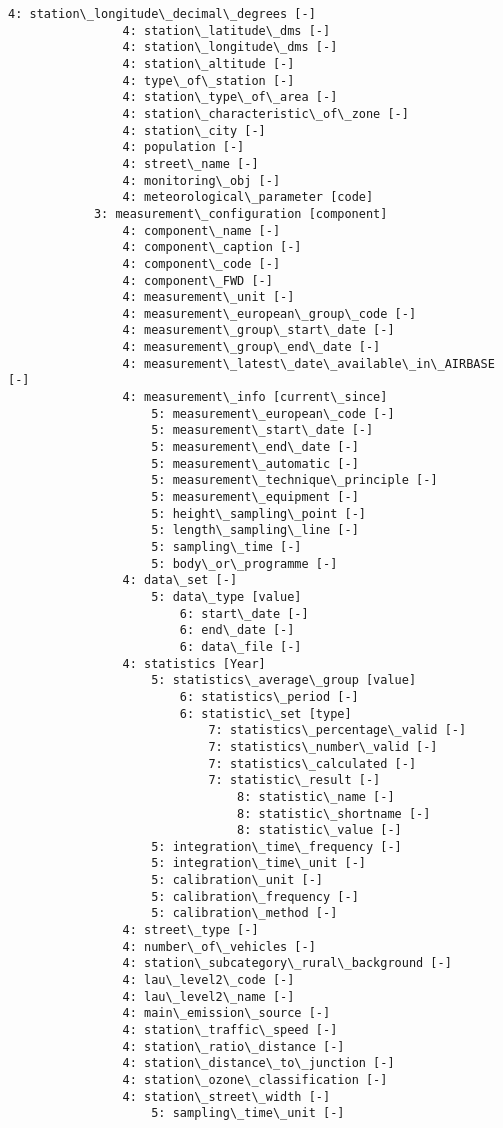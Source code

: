 \documentclass[11pt]{article}
\begin{document}
\begin{Verbatim}[commandchars=\\\{\}]
                4: station\_longitude\_decimal\_degrees [-]
                4: station\_latitude\_dms [-]
                4: station\_longitude\_dms [-]
                4: station\_altitude [-]
                4: type\_of\_station [-]
                4: station\_type\_of\_area [-]
                4: station\_characteristic\_of\_zone [-]
                4: station\_city [-]
                4: population [-]
                4: street\_name [-]
                4: monitoring\_obj [-]
                4: meteorological\_parameter [code]
            3: measurement\_configuration [component]
                4: component\_name [-]
                4: component\_caption [-]
                4: component\_code [-]
                4: component\_FWD [-]
                4: measurement\_unit [-]
                4: measurement\_european\_group\_code [-]
                4: measurement\_group\_start\_date [-]
                4: measurement\_group\_end\_date [-]
                4: measurement\_latest\_date\_available\_in\_AIRBASE [-]
                4: measurement\_info [current\_since]
                    5: measurement\_european\_code [-]
                    5: measurement\_start\_date [-]
                    5: measurement\_end\_date [-]
                    5: measurement\_automatic [-]
                    5: measurement\_technique\_principle [-]
                    5: measurement\_equipment [-]
                    5: height\_sampling\_point [-]
                    5: length\_sampling\_line [-]
                    5: sampling\_time [-]
                    5: body\_or\_programme [-]
                4: data\_set [-]
                    5: data\_type [value]
                        6: start\_date [-]
                        6: end\_date [-]
                        6: data\_file [-]
                4: statistics [Year]
                    5: statistics\_average\_group [value]
                        6: statistics\_period [-]
                        6: statistic\_set [type]
                            7: statistics\_percentage\_valid [-]
                            7: statistics\_number\_valid [-]
                            7: statistics\_calculated [-]
                            7: statistic\_result [-]
                                8: statistic\_name [-]
                                8: statistic\_shortname [-]
                                8: statistic\_value [-]
                    5: integration\_time\_frequency [-]
                    5: integration\_time\_unit [-]
                    5: calibration\_unit [-]
                    5: calibration\_frequency [-]
                    5: calibration\_method [-]
                4: street\_type [-]
                4: number\_of\_vehicles [-]
                4: station\_subcategory\_rural\_background [-]
                4: lau\_level2\_code [-]
                4: lau\_level2\_name [-]
                4: main\_emission\_source [-]
                4: station\_traffic\_speed [-]
                4: station\_ratio\_distance [-]
                4: station\_distance\_to\_junction [-]
                4: station\_ozone\_classification [-]
                4: station\_street\_width [-]
                    5: sampling\_time\_unit [-]

    \end{Verbatim}
\end{document}
